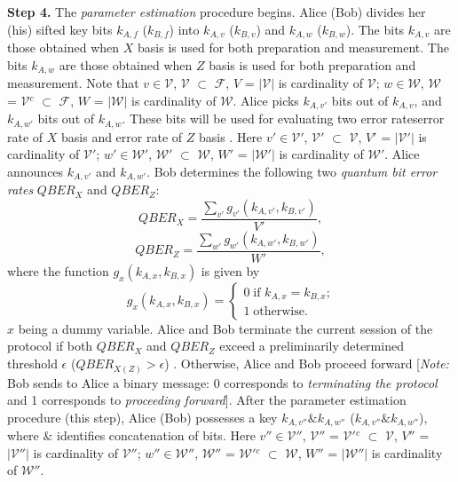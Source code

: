 \documentclass[journal,onecolumn]{IEEEtran}
\theoremstyle{thmstyleone}%
\theoremstyle{thmstyletwo}%
\theoremstyle{thmstylethree}%
\begin{document}
	\textbf{Step 4.} The \textit{parameter estimation} procedure begins. Alice (Bob) divides her (his) sifted key bits $k_{A,f}$ ($k_{B,f}$) into $k_{A,v}$ ($k_{B,v}$) and $k_{A,w}$ ($k_{B,w}$). The bits $k_{A,v}$ are those obtained when $X$ basis is used for both preparation and measurement. The bits $k_{A,w}$ are those obtained when $Z$ basis is used for both preparation and measurement. Note that $v \in \mathcal{V}$, $\mathcal{V}$ $\subset$ $\mathcal{F}$, $V$ = $|\mathcal{V}|$ is cardinality of $\mathcal{V}$; $w \in \mathcal{W}$, $\mathcal{W}$ = $\mathcal{V}$$^c$ $\subset$ $\mathcal{F}$, $W$ = $|\mathcal{W}|$ is cardinality of $\mathcal{W}$. Alice picks $k_{A,v'}$ bits out of $k_{A,v}$, and $k_{A,w'}$ bits out of $k_{A,w}$. These bits will be used for evaluating two error rates\textemdash error rate of $X$ basis and error rate of $Z$ basis \cite{Lo2005}. Here $v' \in \mathcal{V'}$, $\mathcal{V'}$ $\subset$ $\mathcal{V}$, $V'$ = $|\mathcal{V'}|$ is cardinality of $\mathcal{V'}$; $w' \in \mathcal{W'}$, $\mathcal{W'}$ $\subset$ $\mathcal{W}$, $W'$ = $|\mathcal{W'}|$ is cardinality of $\mathcal{W'}$. Alice announces $k_{A,v'}$ and $k_{A,w'}$. Bob determines the following two \textit{quantum bit error rates} $QBER_X$ and $QBER_Z$:
	\begin{equation}
		QBER_X = \frac{\sum_{v'} g_{v'}(k_{A,v'},k_{B,v'})}{V'},
	\end{equation}
	\begin{equation}
		QBER_Z = \frac{\sum_{w'} g_{w'}(k_{A,w'},k_{B,w'})}{W'},
	\end{equation}
	where the function $g_x(k_{A,x},k_{B,x})$ is given by
	\begin{equation}
		g_x(k_{A,x},k_{B,x}) = \begin{cases}
			\text{0} \; \text{if $k_{A,x}=k_{B,x}$;}\\
			\text{1} \; \text{otherwise.}
		\end{cases}
	\end{equation}
	$x$ being a dummy variable. Alice and Bob terminate the current session of the protocol if both $QBER_X$ and $QBER_Z$ exceed a preliminarily determined threshold $\epsilon$ ($QBER_{X(Z)} > \epsilon$) \cite{Lo2005}. Otherwise, Alice and Bob proceed forward [\textit{Note:} Bob sends to Alice a binary message: 0 corresponds to \textit{terminating the protocol} and 1 corresponds to \textit{proceeding forward}]. After the parameter estimation procedure (this step), Alice (Bob) possesses a key $k_{A,v''}\textbf{\&}k_{A,w''}$ ($k_{A,v''}\textbf{\&}k_{A,w''}$), where $\textbf{\&}$ identifies concatenation of bits. Here $v'' \in \mathcal{V''}$, $\mathcal{V''}$ = $\mathcal{V'}$$^c$ $\subset$ $\mathcal{V}$, $V''$ = $|\mathcal{V''}|$ is cardinality of $\mathcal{V''}$; $w'' \in \mathcal{W''}$, $\mathcal{W''}$ = $\mathcal{W'}$$^c$ $\subset$ $\mathcal{W}$, $W''$ = $|\mathcal{W''}|$ is cardinality of $\mathcal{W''}$.\\
$$
\end{document}
